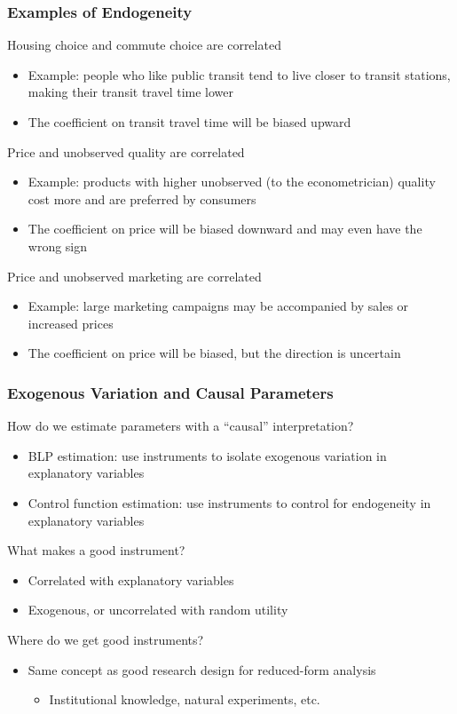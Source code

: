 \documentclass{beamer}
\begin{document}
\begin{frame}\frametitle{Examples of Endogeneity}
    Housing choice and commute choice are correlated
    \begin{itemize}
        \item Example: people who like public transit tend to live closer to transit stations, making their transit travel time lower
        \item The coefficient on transit travel time will be biased upward
    \end{itemize}
    \vspace{2ex}
    Price and unobserved quality are correlated
    \begin{itemize}
        \item Example: products with higher unobserved (to the econometrician) quality cost more and are preferred by consumers
        \item The coefficient on price will be biased downward and may even have the wrong sign
    \end{itemize}
    \vspace{2ex}
    Price and unobserved marketing are correlated
    \begin{itemize}
        \item Example: large marketing campaigns may be accompanied by sales or increased prices
        \item The coefficient on price will be biased, but the direction is uncertain
    \end{itemize}
\end{frame}

\begin{frame}\frametitle{Exogenous Variation and Causal Parameters}
    How do we estimate parameters with a ``causal'' interpretation?
    \begin{itemize}
    	\item BLP estimation: use instruments to isolate exogenous variation in explanatory variables
    	\item Control function estimation: use instruments to control for endogeneity in explanatory variables
    \end{itemize}
    \vspace{2ex}
    What makes a good instrument?
    \begin{itemize}
    	\item Correlated with explanatory variables
    	\item Exogenous, or uncorrelated with random utility
    \end{itemize}
    \vspace{2ex}
    Where do we get good instruments?
    \begin{itemize}
    	\item Same concept as good research design for reduced-form analysis
    	\begin{itemize}
    		\item Institutional knowledge, natural experiments, etc.
    	\end{itemize}
    \end{itemize}
\end{frame}
\end{document}
